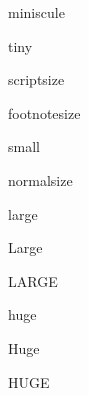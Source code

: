 %

\NewDocumentCommand \miniscule {}
  { {miniscule}}

\NewDocumentCommand \tiny {}
  { {tiny}}

\NewDocumentCommand \scriptsize {}
  { {scriptsize}}

\NewDocumentCommand \footnotesize {}
  { {footnotesize}}

\NewDocumentCommand \small {}
  { {small}}

\RenewDocumentCommand \normalsize {}
  { {normalsize}}

\NewDocumentCommand \large {}
  { {large}}

\NewDocumentCommand \Large {}
  { {Large}}

\NewDocumentCommand \LARGE {}
  { {LARGE}}

\NewDocumentCommand \huge {}
  { {huge}}

\NewDocumentCommand \Huge {}
  { {Huge}}

\NewDocumentCommand \HUGE {}
  { {HUGE}}
